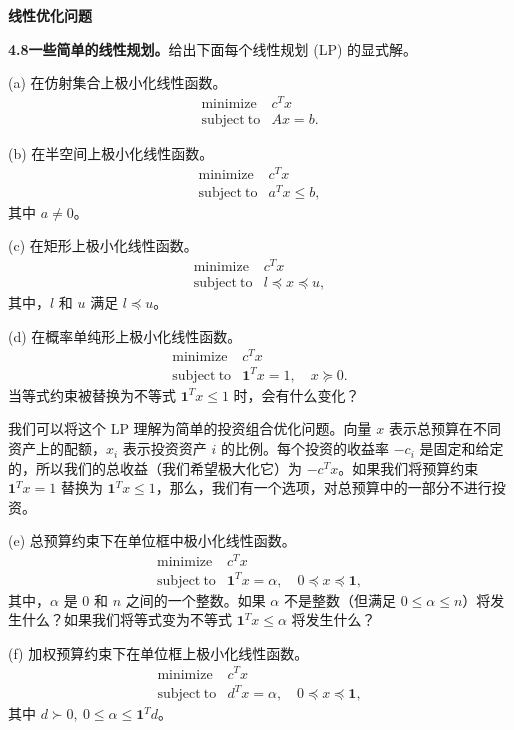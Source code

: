 \documentclass[UTF8, 12pt, fontset=fandol, oneside]{ctexart}
\begin{document}
\noindent\textbf{线性优化问题}

\noindent\textbf{4.8\quad 一些简单的线性规划。}\quad 给出下面每个线性规划 (LP) 的显式解。

(a) 在仿射集合上极小化线性函数。
\[
\begin{array}{ll}
\mathop{\mathrm{minimize}} & c^Tx\\
\mathrm{subject\ to} & Ax=b.
\end{array}
\]

(b) 在半空间上极小化线性函数。
\[
\begin{array}{ll}
\mathop{\mathrm{minimize}} & c^Tx\\
\mathrm{subject\ to} & a^Tx\leq b,
\end{array}
\]
其中 $a\neq0$。

(c) 在矩形上极小化线性函数。
\[
\begin{array}{ll}
\mathop{\mathrm{minimize}} & c^Tx\\
\mathrm{subject\ to} & l\preceq x\preceq u,
\end{array}
\]
其中，$l$ 和 $u$ 满足 $l\preceq u$。

(d) 在概率单纯形上极小化线性函数。
\[
\begin{array}{ll}
\mathop{\mathrm{minimize}} & c^Tx\\
\mathrm{subject\ to} & \mathbf{1}^Tx=1,\quad x\succeq0.
\end{array}
\]
当等式约束被替换为不等式 $\mathbf{1}^Tx\leq1$ 时，会有什么变化？

我们可以将这个 LP 理解为简单的投资组合优化问题。向量 $x$ 表示总预算在不同资产上的配额，$x_i$ 表示投资资产 $i$ 的比例。每个投资的收益率 $-c_i$ 是固定和给定的，所以我们的总收益（我们希望极大化它）为 $-c^Tx$。如果我们将预算约束 $\mathbf{1}^Tx=1$ 替换为 $\mathbf{1}^Tx\leq1$，那么，我们有一个选项，对总预算中的一部分不进行投资。

(e) 总预算约束下在单位框中极小化线性函数。
\[
\begin{array}{ll}
\mathop{\mathrm{minimize}} & c^Tx\\
\mathrm{subject\ to} & \mathbf{1}^Tx=\alpha,\quad 0\preceq x\preceq\mathbf{1},
\end{array}
\]
其中，$\alpha$ 是 $0$ 和 $n$ 之间的一个整数。如果 $\alpha$ 不是整数（但满足 $0\leq\alpha\leq n$）将发生什么？如果我们将等式变为不等式 $\mathbf{1}^Tx\leq\alpha$ 将发生什么？

(f) 加权预算约束下在单位框上极小化线性函数。
\[
\begin{array}{ll}
\mathop{\mathrm{minimize}} & c^Tx\\
\mathrm{subject\ to} & d^Tx=\alpha,\quad 0\preceq x\preceq\mathbf{1},
\end{array}
\]
其中 $d\succ0,\ 0\leq\alpha\leq\mathbf{1}^Td$。
\end{document}

